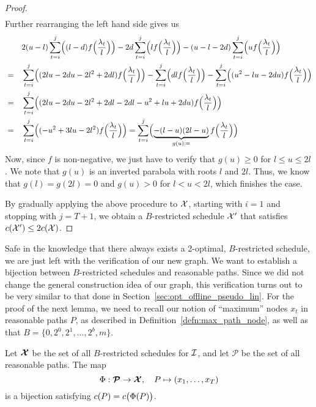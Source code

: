 \begin{proof}
\begin{align*}
\end{align*}
Further rearranging the left hand side gives us
\begin{align*}
	&&&2(u-l)\sum\limits_{t=i}^j\Bigl((l-d)f\Bigl(\frac{\lambda_t}{l}\Bigr)\Bigr)-2d\sum\limits_{t=i}^j\Bigl(lf\Bigl(\frac{\lambda_t}{l}\Bigr)\Bigr)-(u-l-2d)\sum\limits_{t=i}^j\Bigl(uf\Bigl(\frac{\lambda_t}{l}\Bigr)\Bigr)\\
	&=&&\sum\limits_{t=i}^j\Bigl((2lu-2du-2l^2+2dl)f\Bigl(\frac{\lambda_t}{l}\Bigr)\Bigr)-\sum\limits_{t=i}^j\Bigl(dlf\Bigl(\frac{\lambda_t}{l}\Bigr)\Bigr)-\sum\limits_{t=i}^j\Bigl((u^2-lu-2du)f\Bigl(\frac{\lambda_t}{l}\Bigr)\Bigr)\\
	&=&&\sum\limits_{t=i}^j\Bigl((2lu-2du-2l^2+2dl-2dl-u^2+lu+2du)f\Bigl(\frac{\lambda_t}{l}\Bigr)\Bigr)\\
	&=&&\sum\limits_{t=i}^j\Bigl((-u^2+3lu-2l^2)f\Bigl(\frac{\lambda_t}{l}\Bigr)\Bigr)=\sum\limits_{t=i}^j\Bigl(\underbrace{-(l-u)(2l-u)}_{g(u)\coloneqq}f\Bigl(\frac{\lambda_t}{l}\Bigr)\Bigr) 
\end{align*}
Now, since $f$ is non-negative, we just have to verify that $g(u)\ge0$ for $l\le u\le 2l$. We note that $g(u)$ is an inverted parabola with roots $l$ and $2l$. Thus, we know that $g(l)=g(2l)=0$ and $g(u)>0$ for $l<u<2l$, which finishes the case.

By gradually applying the above procedure to $\mathcal{X}$, starting with $i=1$ and stopping with $j=T+1$, we obtain a $B$-restricted schedule $\mathcal{X}'$ that satisfies $c(\mathcal{X}')\le2c(\mathcal{X})$.
\end{proof}
Safe in the knowledge that there always exists a 2-optimal, $B$-restricted schedule, we are just left with the verification of our new graph. We want to establish a bijection between $B$-restricted schedules and reasonable paths. Since we did not change the general construction idea of our graph, this verification turns out to be very similar to that done in Section~\ref{sec:opt_offline_pseudo_lin}. For the proof of the next lemma, we need to recall our notion of ``maximum'' nodes $x_t$ in reasonable paths $P$, as described in Definition~\ref{defn:max_path_node}, as well as that $B=\{0,2^0,2^1,\dotsc,2^b,m\}$.
\begin{lem}\label{lem:sched_reasn_path_approx_2}
Let $\bm{\mathcal{X}}$ be the set of all $B$-restricted schedules for $\mathcal{I}$, and let $\bm{\mathcal{P}}$ be the set of all reasonable paths. The map
\begin{equation*}
	\Phi:\bm{\mathcal{P}}\rightarrow\bm{\mathcal{X}},\quad P\mapsto (x_1,\dotsc,x_T)
\end{equation*}
is a bijection satisfying $c(P)=c\bigl(\Phi(P)\bigr)$.
\end{lem}
